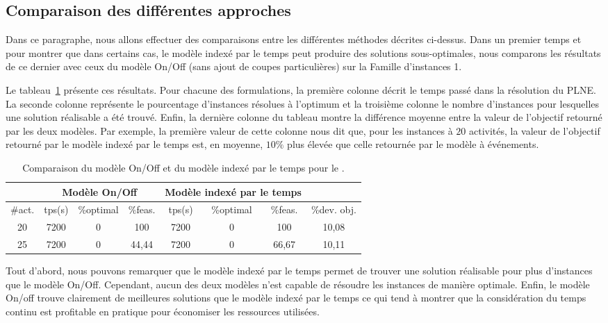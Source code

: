 \subsection{Comparaison des différentes approches}

Dans ce paragraphe, nous allons effectuer des comparaisons entre
les différentes méthodes décrites ci-dessus. Dans un premier temps et
pour montrer que dans certains cas, le modèle indexé par le temps peut
produire des solutions sous-optimales, nous comparons les résultats de
ce dernier avec ceux du modèle On/Off (sans ajout de coupes
particulières) sur la Famille d'instances 1.   

Le tableau~\ref{CECSPMIPOBJ} présente ces résultats. Pour chacune des
formulations, la première colonne décrit le temps passé dans la
résolution du PLNE. La seconde colonne représente le pourcentage
d'instances résolues à l'optimum et la troisième colonne le nombre
d'instances pour lesquelles une solution réalisable a été
trouvé. Enfin, la dernière colonne du tableau montre la différence
moyenne entre la valeur de l'objectif retourné par les deux
modèles. Par exemple, la première valeur de cette colonne nous dit
que, pour les instances à $20$ activités, la valeur de l'objectif
retourné par le modèle indexé par le temps est, en moyenne, $10\%$
plus élevée que celle retournée par le modèle à événements. 

\begin{table}[ht] \centering
  \begin{tabular}{|c|ccc|ccc|c|}
    \hline
    & \multicolumn{3}{c|}{Modèle On/Off} &  \multicolumn{3}{c|}{Modèle
                                           indexé par le temps} &\\
    \hline
    \#act.&tps(s)&\%optimal&\%feas.&tps(s)&\%optimal
                              &\%feas.&\%dev. obj. \\
    \hline
    20 &7200 &0 &100 &7200 &0 &100 & 10,08\\
    25 &7200 &0 &44,44 &7200 &0 &66,67 & 10,11\\
    \hline
  \end{tabular}
  \caption{Comparaison du modèle On/Off et du modèle indexé par le
    temps pour le \CECSP.}
  \label{CECSPMIPOBJ}
\end{table}

Tout d'abord, nous pouvons remarquer que le modèle indexé par le temps
permet de trouver une solution réalisable pour plus d'instances que le
modèle On/Off. Cependant, aucun des deux modèles n'est capable de
résoudre les instances de manière optimale. Enfin, le modèle On/off
trouve clairement de meilleures solutions que le modèle indexé par le
temps ce qui tend à montrer que la considération du temps continu est
profitable en pratique pour économiser les ressources utilisées.

